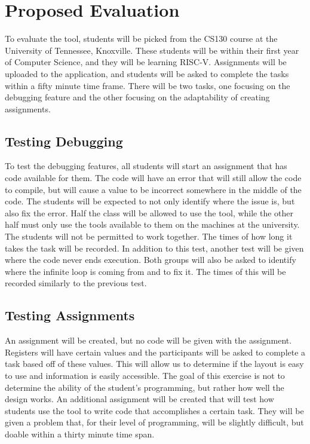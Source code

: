 


\section{Proposed Evaluation}
To evaluate the tool, students will be picked from the CS130 course at the University of Tennessee, Knoxville.
%
These students will be within their first year of Computer Science, and they will be learning RISC-V.
%
Assignments will be uploaded to the application, and students will be asked to complete the tasks within a fifty minute time frame.
%
There will be two tasks, one focusing on the debugging feature and the other focusing on the adaptability of creating assignments.


\subsection{Testing Debugging}
To test the debugging features, all students will start an assignment that has code available for them.
%
The code will have an error that will still allow the code to compile, but will cause a value to be incorrect somewhere in the middle of the code.
%
The students will be expected to not only identify where the issue is, but also fix the error.
%
Half the class will be allowed to use the tool, while the other half must only use the tools available to them on the machines at the university.
%
The students will not be permitted to work together.
%
The times of how long it takes the task will be recorded.
%
In addition to this test, another test will be given where the code never ends execution.
%
Both groups will also be asked to identify where the infinite loop is coming from and to fix it.
%
The times of this will be recorded similarly to the previous test.


\subsection{Testing Assignments}
An assignment will be created, but no code will be given with the assignment.
%
Registers will have certain values and the participants will be asked to complete a task based off of these values.
%
This will allow us to determine if the layout is easy to use and information is easily accessible.
%
The goal of this exercise is not to determine the ability of the student's programming, but rather how well the design works.
%
An additional assignment will be created that will test how students use the tool to write code that accomplishes a certain task.
%
They will be given a problem that, for their level of programming, will be slightly difficult, but doable within a thirty minute time span.
%
